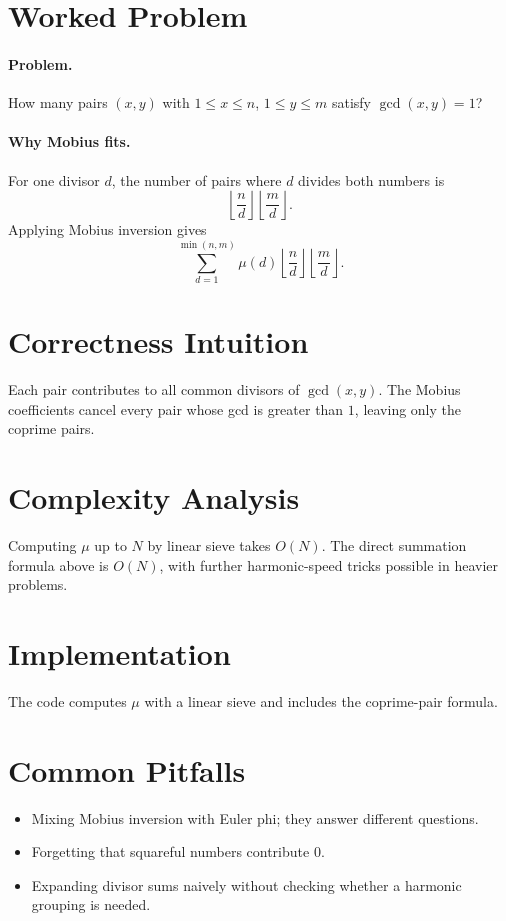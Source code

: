 \section*{Worked Problem}

\paragraph{Problem.}
How many pairs \((x, y)\) with \(1 \le x \le n\), \(1 \le y \le m\) satisfy \(\gcd(x, y) = 1\)?

\paragraph{Why Mobius fits.}
For one divisor \(d\), the number of pairs where \(d\) divides both numbers is
\[
\left\lfloor \frac{n}{d} \right\rfloor \left\lfloor \frac{m}{d} \right\rfloor.
\]
Applying Mobius inversion gives
\[
\sum_{d=1}^{\min(n,m)} \mu(d)\left\lfloor \frac{n}{d} \right\rfloor \left\lfloor \frac{m}{d} \right\rfloor.
\]

\section*{Correctness Intuition}

Each pair contributes to all common divisors of \(\gcd(x,y)\). The Mobius coefficients cancel every pair whose gcd is
greater than \(1\), leaving only the coprime pairs.

\section*{Complexity Analysis}

Computing \(\mu\) up to \(N\) by linear sieve takes \(O(N)\). The direct summation formula above is \(O(N)\), with
further harmonic-speed tricks possible in heavier problems.

\section*{Implementation}

The code computes \(\mu\) with a linear sieve and includes the coprime-pair formula.

\section*{Common Pitfalls}

\begin{itemize}
  \item Mixing Mobius inversion with Euler phi; they answer different questions.
  \item Forgetting that squareful numbers contribute \(0\).
  \item Expanding divisor sums naively without checking whether a harmonic grouping is needed.
\end{itemize}

